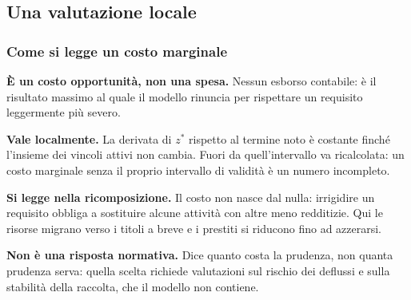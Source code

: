 

\subsection{Una valutazione locale}%

\begin{frame}%
%

\frametitle{Come si legge un costo marginale}%
%

%


\begin{stepitemize}
\item \textbf{\`{E} un costo opportunit\`{a}, non una spesa.} Nessun esborso
contabile: \`{e} il risultato massimo al quale il modello rinuncia per
rispettare un requisito leggermente pi\`{u} severo.

\item \textbf{Vale localmente.} La derivata di $z^{*}$ rispetto al termine
noto \`{e} costante finch\'{e} l'insieme dei vincoli attivi non cambia. Fuori
da quell'intervallo va ricalcolata: un costo marginale senza il proprio
intervallo di validit\`{a} \`{e} un numero incompleto.

\item \textbf{Si legge nella ricomposizione.} Il costo non nasce dal nulla:
irrigidire un requisito obbliga a sostituire alcune attivit\`{a} con altre
meno redditizie. Qui le risorse migrano verso i titoli a breve e i prestiti si
riducono fino ad azzerarsi.

\item \textbf{Non \`{e} una risposta normativa.} Dice quanto costa la
prudenza, non quanta prudenza serva: quella scelta richiede valutazioni sul
rischio dei deflussi e sulla stabilit\`{a} della raccolta, che il modello non contiene.
\end{stepitemize}

%

\transboxout
\end{frame}%


